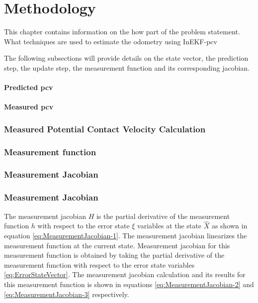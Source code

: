 \documentclass[report.tex]{subfiles}
\begin{document}
    \chapter{Methodology} \label{chap:methodology}

    This chapter contains information on the how part of the problem statement. What techniques are used to estimate the odometry using InEKF-pcv
        
    The following subsections will provide details on the state vector, the prediction step, the update step, the measurement function and its corresponding jacobian.
       
    \subsubsection{Predicted \gls{pcv}}
    

    
    \subsubsection{Measured \gls{pcv}}        

        
    \subsection{Measured Potential Contact Velocity Calculation}
        

    
    \subsection{Measurement function} 
    
    \subsection{Measurement Jacobian} \label{subsec:inekfMeasurementJacobian}
    
    
    \subsection{Measurement Jacobian}
    
        The measurement jacobian $H$ is the partial derivative of the measurement function $h$ with respect to the error state $\xi$ variables at the state $\hat{X}$ as shown in equation \ref{eq:MeasurementJacobian-1}. The measurement jacobian linearizes the measurement function at the current state. Measurement jacobian for this measurement function is obtained by taking the partial derivative of the measurement function with respect to the error state variables \ref{eq:ErrorStateVector}. The measurement jacobian calculation and its results for this measurement function is shown in equations \ref{eq:MeasurementJacobian-2} and \ref{eq:MeasurementJacobian-3} respectively.
\end{document}
